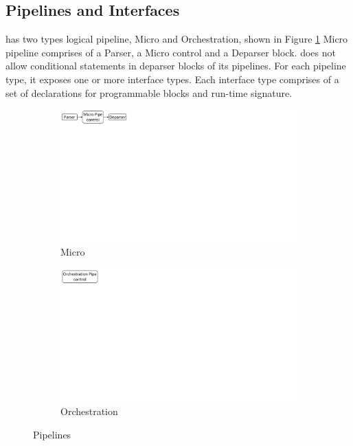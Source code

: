 \documentclass[letterpaper,twocolumn,10pt]{article}
\begin{document}
\subsection{Pipelines and Interfaces}
\label{sec:pipelines}
\uarch has two types logical pipeline, Micro and Orchestration, shown in Figure \ref{fig:msa-pipelines}
Micro pipeline comprises of a Parser, a Micro control and a Deparser block.
\uarch does not allow conditional statements in deparser blocks of its pipelines.
For each pipeline type, it exposes one or more interface types.
Each interface type comprises of a set of declarations for programmable blocks and run-time signature.
\begin{figure}[ht]
    \centering
    \begin{subfigure}{0.59\linewidth}
        \centering
        \includegraphics[trim=0 482 692 0, clip,scale=0.45]{msa-pipeline}
        \caption{Micro}
    \end{subfigure}\vline
    \begin{subfigure}{0.41\linewidth}
        \centering
        \includegraphics[trim=0 480 805 0,clip,scale=0.45]{micro-orchestration-pipeline}
        \caption{Orchestration}
    \end{subfigure}
\caption{\uarch Pipelines}
\label{fig:msa-pipelines}
\end{figure}
\end{document}
